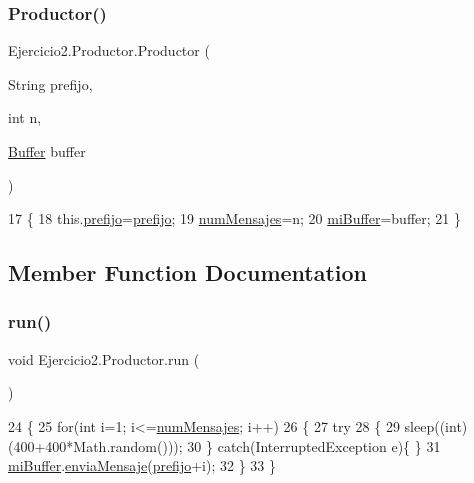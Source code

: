 \subsubsection{\texorpdfstring{Productor()}{Productor()}}
{\footnotesize\ttfamily Ejercicio2.\+Productor.\+Productor (\begin{DoxyParamCaption}\item[{String}]{prefijo,  }\item[{int}]{n,  }\item[{\mbox{\hyperlink{class_ejercicio2_1_1_buffer}{Buffer}}}]{buffer }\end{DoxyParamCaption})\hspace{0.3cm}{\ttfamily [inline]}}


\begin{DoxyCode}
17     \{
18         this.\mbox{\hyperlink{class_ejercicio2_1_1_productor_a7afbe84dee1488cfae3b8555281a4e3f}{prefijo}}=\mbox{\hyperlink{class_ejercicio2_1_1_productor_a7afbe84dee1488cfae3b8555281a4e3f}{prefijo}};
19         \mbox{\hyperlink{class_ejercicio2_1_1_productor_aa0ad1c460b23e61a4f67420e0ab5f7fa}{numMensajes}}=n;
20         \mbox{\hyperlink{class_ejercicio2_1_1_productor_a0321b6e81e1f2486ca097a1f36de7952}{miBuffer}}=buffer;
21     \}
\end{DoxyCode}


\subsection{Member Function Documentation}
\mbox{\label{class_ejercicio2_1_1_productor_a326c43803b7561976965faf07ccb0788}} 
\subsubsection{\texorpdfstring{run()}{run()}}
{\footnotesize\ttfamily void Ejercicio2.\+Productor.\+run (\begin{DoxyParamCaption}{ }\end{DoxyParamCaption})\hspace{0.3cm}{\ttfamily [inline]}}


\begin{DoxyCode}
24     \{
25         \textcolor{keywordflow}{for}(\textcolor{keywordtype}{int} i=1; i<=\mbox{\hyperlink{class_ejercicio2_1_1_productor_aa0ad1c460b23e61a4f67420e0ab5f7fa}{numMensajes}}; i++)
26         \{
27             \textcolor{keywordflow}{try}
28             \{
29                 sleep((\textcolor{keywordtype}{int})(400+400*Math.random()));
30             \} \textcolor{keywordflow}{catch}(InterruptedException e)\{  \}
31             \mbox{\hyperlink{class_ejercicio2_1_1_productor_a0321b6e81e1f2486ca097a1f36de7952}{miBuffer}}.\mbox{\hyperlink{class_ejercicio2_1_1_buffer_ab6e3390ea3256bde697612255687aafc}{enviaMensaje}}(\mbox{\hyperlink{class_ejercicio2_1_1_productor_a7afbe84dee1488cfae3b8555281a4e3f}{prefijo}}+i);
32         \}
33     \}
\end{DoxyCode}


